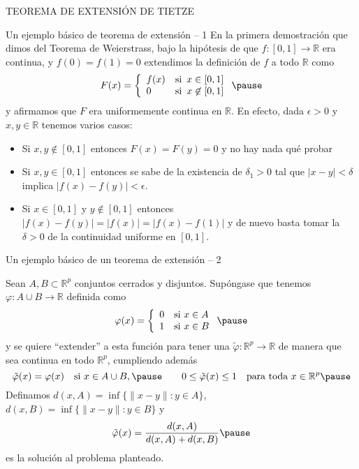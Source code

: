\documentclass[xcolor=dvipsnames,10pt,handout, draft]{beamer}
\newcommand{\rz}{\mathbb R}
\newcommand{\rzp}{\mathbb R^{p}}
\begin{document}
\begin{frame}
TEOREMA DE EXTENSI\'ON DE TIETZE
\end{frame}


\begin{frame}{Un ejemplo b\'asico de teorema de extensi\'on -- 1}
En la primera demostraci\'on que dimos del Teorema de Weierstrass, bajo la hip\'otesis de que $f:[0,1]\to\rz$ era continua, y $f(0)=f(1)=0$ extendimos la definici\'on de $f$ a todo $\rz$ como 
$$F(x)=\left\{\begin{array}{ll}
			f(x)&\text{si }\,x\in[0,1]\\
			0&\text{si }\,x\not\in[0,1]
		\end{array}\right.\pause$$
y afirmamos que $F$ era uniformemente continua en $\rz$.
\pause\vskip5pt
En efecto, dada $\epsilon>0$ y $x,y\in\rz$ tenemos varios casos:
\begin{itemize}
\item Si $x,y\not\in[0,1]$ entonces $F(x)=F(y)=0$ y no hay nada qué probar\pause
\item Si $x,y\in[0,1]$ entonces se sabe de la existencia de $\delta_1>0$ tal que $|x-y|<\delta$ implica $|f(x)-f(y)|<\epsilon$.\pause
\item Si $x\in [0,1]$ y $y\not\in[0,1]$ entonces $|f(x)-f(y)|=|f(x)|=|f(x)-f(1)|$ y de nuevo basta tomar la $\delta>0$ de la continuidad uniforme en $[0,1]$.
\end{itemize}
\end{frame}


\begin{frame}{Un ejemplo b\'asico de un teorema de extensi\'on -- 2}

\pause 
Sean $A,B\subset\rzp$ conjuntos cerrados y disjuntos.
\vskip4pt\pause
Sup\'ongase que tenemos $\varphi:A\cup B\to\rz$ definida como
$$\varphi(x)=\left\{\begin{array}{ll}
					0&\text{si }x\in A\\
					1&\text{si }x\in B
					\end{array}\right.\pause$$
y se quiere ``extender'' a esta funci\'on para tener una $\tilde\varphi:\rzp\to\rz$ de manera que sea continua en todo $\rzp$, cumpliendo adem\'as 
$$\tilde\varphi(x)=\varphi(x)\quad\text{si }x\in A\cup B,\pause\qquad 0\leq\tilde\varphi(x)\leq1\quad \text{para toda }x\in\rzp\pause$$ 
Definamos $d(x,A)=\inf\big\{\|x-y\|:y\in A\big\}$, \pause $d(x,B)=\inf\big\{\|x-y\|:y\in B\big\}$ \pause y 
$$\tilde\varphi(x)=\frac{d(x,A)}{d(x,A)+d(x,B)}\pause$$
es la soluci\'on al problema planteado.

\end{frame}
\end{document}
